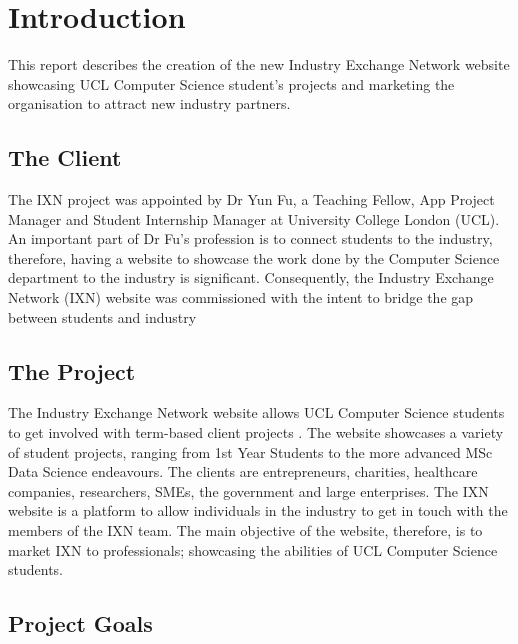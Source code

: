 \hypertarget{introduction}{%
\section{Introduction}\label{introduction}}

This report describes the creation of the new Industry Exchange Network
website showcasing UCL Computer Science student's projects and marketing
the organisation to attract new industry partners.

\hypertarget{the-client}{%
\subsection{The Client}\label{the-client}}

The IXN project was appointed by Dr Yun Fu, a Teaching Fellow, App
Project Manager and Student Internship Manager at University College
London (UCL). An important part of Dr Fu's profession is to connect
students to the industry, therefore, having a website to showcase the
work done by the Computer Science department to the industry is
significant. Consequently, the Industry Exchange Network (IXN) website
was commissioned with the intent to bridge the gap between students and
industry

\hypertarget{the-project}{%
\subsection{The Project}\label{the-project}}

The Industry Exchange Network website allows UCL Computer Science
students to get involved with term-based client projects \cite{g1}. The
website showcases a variety of student projects, ranging from 1st Year
Students to the more advanced MSc Data Science endeavours. The clients
are entrepreneurs, charities, healthcare companies, researchers, SMEs,
the government and large enterprises. The IXN website is a platform to
allow individuals in the industry to get in touch with the members of
the IXN team. The main objective of the website, therefore, is to market
IXN to professionals; showcasing the abilities of UCL Computer Science
students.

\hypertarget{project-goals}{%
\subsection{Project Goals}\label{project-goals}}

